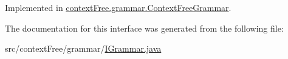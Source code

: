 Implemented in \hyperlink{classcontext_free_1_1grammar_1_1_context_free_grammar_a922203e2db862d2a8ab31e8e7736273b}{context\-Free.\-grammar.\-Context\-Free\-Grammar}.



The documentation for this interface was generated from the following file\-:\begin{DoxyCompactItemize}
\item 
src/context\-Free/grammar/\hyperlink{_i_grammar_8java}{I\-Grammar.\-java}\end{DoxyCompactItemize}
